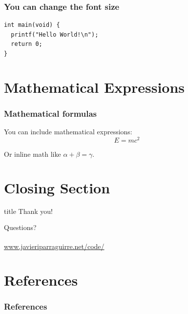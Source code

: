 \documentclass[aspectratio=169]{beamer}
\begin{document}
\begin{frame}[fragile]
  \frametitle{You can change the font size}
  \begin{lstlisting}[basicstyle=\ttfamily\large\color{grayUTNdark}]
int main(void) {
  printf("Hello World!\n");
  return 0;
}
\end{lstlisting}
\end{frame}

\section{Mathematical Expressions}
\begin{frame}
  \frametitle{Mathematical formulas}
  You can include mathematical expressions:
  \begin{equation}
    E = mc^2
  \end{equation}

  Or inline math like $\alpha + \beta = \gamma$.
\end{frame}

\section{Closing Section}
\begin{frame}
  \begin{center}
    \begin{beamercolorbox}[sep=8pt,center]{title}
      \Large{Thank you!}
    \end{beamercolorbox}
    \vspace{1em}
    \huge{Questions?}\\
    \vspace{1em}
    \small{\email}\\
    \small{\url{www.javieriparraguirre.net/code/}}
  \end{center}
\end{frame}

{
\utnbhinologo
\section{References}
\begin{frame}[allowframebreaks]
  \frametitle{References}
  
  
\end{frame}
}
\end{document}
